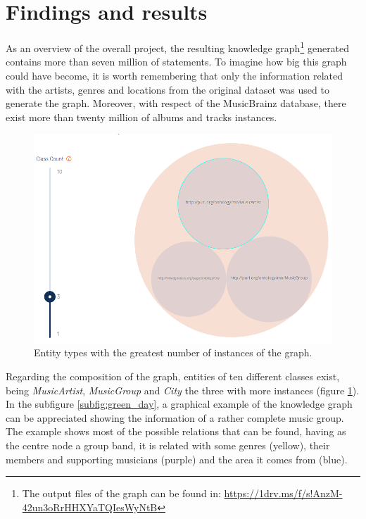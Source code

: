 \section{Findings and results}
As an overview of the overall project, the resulting knowledge graph\footnote{The output files of the graph can be found in: \url{https://1drv.ms/f/s!AnzM-42un3oRrHHXYaTQIesWyNtB}} generated contains more than seven million of statements.
To imagine how big this graph could have become, it is worth remembering that only the information related with the artists, genres and locations from the original dataset was used to generate the graph.
Moreover, with respect of the MusicBrainz database, there exist more than twenty million of albums and tracks instances.

\begin{figure}[!tbh]
\centering
\includegraphics[width=0.8\linewidth]{images/classes}
\caption{Entity types with the greatest number of instances of the graph.}
\label{fig:classes}
\end{figure} 

Regarding the composition of the graph, entities of ten different classes exist, being \textit{MusicArtist}, \textit{MusicGroup} and \textit{City} the three with more instances (figure \ref{fig:classes}). In the subfigure \ref{subfig:green_day}, a graphical example of the knowledge graph can be appreciated showing the information of a rather complete music group. The example shows most of the possible relations that can be found, having as the centre node a group band, it is related with some genres (yellow), their members and supporting musicians (purple) and the area it comes from (blue).

